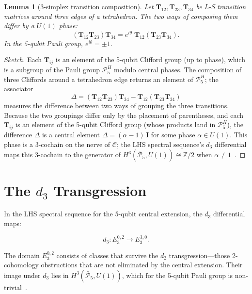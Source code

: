 \documentclass[11pt]{article}
\newtheorem{lemma}[theorem]{Lemma}
\begin{document}
\begin{lemma}[3-simplex transition composition]
\label{lem:3simplex-comp}
Let $\mathbf{T}_{12}, \mathbf{T}_{23}, \mathbf{T}_{34}$ be L-S transition
matrices around three edges of a tetrahedron. The two ways of composing
them differ by a $U(1)$ phase:
\[
(\mathbf{T}_{12}\mathbf{T}_{23})\mathbf{T}_{34}
= e^{i\theta} \; \mathbf{T}_{12}(\mathbf{T}_{23}\mathbf{T}_{34}).
\]
In the 5-qubit Pauli group, $e^{i\theta} = \pm 1$.
\end{lemma}

\begin{proof}[Sketch]
Each $\mathbf{T}_{ij}$ is an element of the 5-qubit Clifford group (up to
phase), which is a subgroup of the Pauli group $\mathcal{P}_5^H$ modulo
central phases. The composition of three Cliffords around a tetrahedron
edge returns an element of $\mathcal{P}_5^H$; the associator
\[
\Delta = (\mathbf{T}_{12}\mathbf{T}_{23})\mathbf{T}_{34}
- \mathbf{T}_{12}(\mathbf{T}_{23}\mathbf{T}_{34})
\]
measures the difference between two ways of grouping the three transitions.
Because the two groupings differ only by the placement of parentheses,
and each $\mathbf{T}_{ij}$ is an element of the 5-qubit Clifford group
(whose products land in $\mathcal{P}_5^H$), the difference $\Delta$ is a
central element $\Delta = (\alpha - 1)\,\mathbf{I}$ for some phase
$\alpha \in U(1)$. This phase is a 3-cochain on the nerve of $\mathcal{C}$;
the LHS spectral sequence's $d_3$ differential maps this 3-cochain to the
generator of $H^3(\bar{\mathcal{P}}_5, U(1)) \cong \mathbb{Z}/2$
when $\alpha \neq 1$~\cite{PaperIV}.
\end{proof}

\section{The $d_3$ Transgression}
\label{sec:d3}

In the LHS spectral sequence for the 5-qubit central extension, the
$d_3$ differential maps:

\[
d_3: E_3^{0,2} \longrightarrow E_3^{3,0}.
\]

The domain $E_3^{0,2}$ consists of classes that survive the $d_2$
transgression---those 2-cohomology obstructions that are not eliminated
by the central extension. Their image under $d_3$ lies in
$H^3(\bar{\mathcal{P}}_5, U(1))$, which for the 5-qubit Pauli group is
non-trivial~\cite{PaperIV}.
\end{document}
